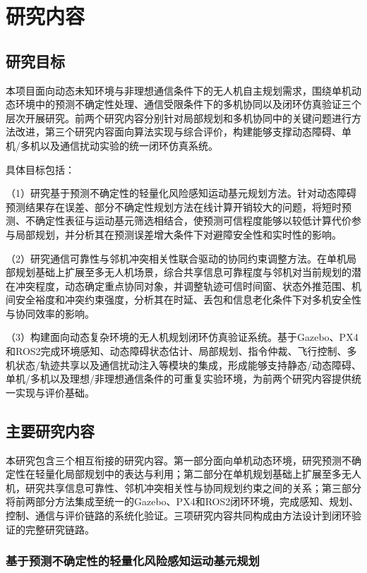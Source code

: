 \chapter{研究内容}

\section{研究目标}

本项目面向动态未知环境与非理想通信条件下的无人机自主规划需求，围绕单机动态环境中的预测不确定性处理、通信受限条件下的多机协同以及闭环仿真验证三个层次开展研究。前两个研究内容分别针对局部规划和多机协同中的关键问题进行方法改进，第三个研究内容面向算法实现与综合评价，构建能够支撑动态障碍、单机/多机以及通信扰动实验的统一闭环仿真系统。

具体目标包括：

（1）研究基于预测不确定性的轻量化风险感知运动基元规划方法。针对动态障碍预测结果存在误差、部分不确定性规划方法在线计算开销较大的问题，将短时预测、不确定性表征与运动基元筛选相结合，使预测可信程度能够以较低计算代价参与局部规划，并分析其在预测误差增大条件下对避障安全性和实时性的影响。

（2）研究通信可靠性与邻机冲突相关性联合驱动的协同约束调整方法。在单机局部规划基础上扩展至多无人机场景，综合共享信息可靠程度与邻机对当前规划的潜在冲突程度，动态确定重点协同对象，并调整轨迹可信时间窗、状态外推范围、机间安全裕度和冲突约束强度，分析其在时延、丢包和信息老化条件下对多机安全性与协同效率的影响。

（3）构建面向动态复杂环境的无人机规划闭环仿真验证系统。基于Gazebo、PX4和ROS2完成环境感知、动态障碍状态估计、局部规划、指令仲裁、飞行控制、多机状态/轨迹共享以及通信扰动注入等模块的集成，形成能够支持静态/动态障碍、单机/多机以及理想/非理想通信条件的可重复实验环境，为前两个研究内容提供统一实现与评价基础。

\section{主要研究内容}

本研究包含三个相互衔接的研究内容。第一部分面向单机动态环境，研究预测不确定性在轻量化局部规划中的表达与利用；第二部分在单机规划基础上扩展至多无人机，研究共享信息可靠性、邻机冲突相关性与协同规划约束之间的关系；第三部分将前两部分方法集成至统一的Gazebo、PX4和ROS2闭环环境，完成感知、规划、控制、通信与评价链路的系统化验证。三项研究内容共同构成由方法设计到闭环验证的完整研究链路。

\subsection{基于预测不确定性的轻量化风险感知运动基元规划}

